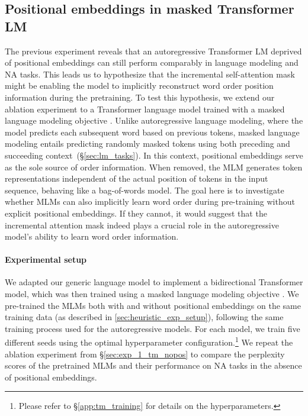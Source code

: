  
\subsection{Positional embeddings in masked Transformer LM } \label{sec:exp_2_mlm_nopos}

The previous experiment reveals that an autoregressive Transformer LM deprived of positional embeddings can still perform comparably in language modeling and NA tasks. This leads us to hypothesize that the incremental self-attention mask might be enabling the model to implicitly reconstruct word order position information during the pretraining. To test this hypothesis, we extend our ablation experiment to a Transformer language model trained with a masked language modeling objective \citep{devlin-etal-2019-bert}. Unlike autoregressive language modeling, where the model predicts each subsequent word based on previous tokens, masked language modeling entails predicting randomly masked tokens using both preceding and succeeding context~(\S\ref{sec:lm_tasks}). In this context, positional embeddings serve as the sole source of order information. When removed, the MLM
generates token representations independent of the actual position of tokens in the input sequence, behaving like a bag-of-words model.  The goal here is to investigate whether MLMs can also implicitly learn word order during pre-training without explicit positional embeddings. If they cannot, it would suggest that the incremental attention mask indeed plays a crucial role in the autoregressive model's ability to learn word order information.


\paragraph{Experimental setup} We adapted our generic language model to implement a bidirectional Transformer model, which was then trained using a masked language modeling objective \citep{devlin-etal-2019-bert}. We pre-trained the MLMs both with and without positional embeddings on the same training data (as described in \ref{sec:heuristic_exp_setup}), following the same training process used for the autoregressive models. For each model, we train five different seeds using the optimal hyperparameter configuration.\footnote{Please refer to \S\ref{app:tm_training} for details on the hyperparameters.} We repeat the ablation experiment from \S\ref{sec:exp_1_tm_nopos} to compare the perplexity scores of the pretrained MLMs and their performance on NA tasks in the absence of positional embeddings.

